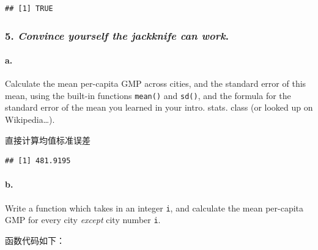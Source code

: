 \documentclass[
]{article}
\newenvironment{Shaded}{\begin{snugshade}}{\end{snugshade}}
\newcommand{\ControlFlowTok}[1]{\textcolor[rgb]{0.13,0.29,0.53}{\textbf{#1}}}
\newcommand{\FunctionTok}[1]{\textcolor[rgb]{0.13,0.29,0.53}{\textbf{#1}}}
\newcommand{\NormalTok}[1]{#1}
\newcommand{\OtherTok}[1]{\textcolor[rgb]{0.56,0.35,0.01}{#1}}
\newcommand{\SpecialCharTok}[1]{\textcolor[rgb]{0.81,0.36,0.00}{\textbf{#1}}}
\begin{document}
\begin{verbatim}
## [1] TRUE
\end{verbatim}

\subsubsection{\texorpdfstring{5. \emph{Convince yourself the jackknife
can
work}.}{5. Convince yourself the jackknife can work.}}\label{convince-yourself-the-jackknife-can-work.}

\paragraph{a.}\label{a.}

Calculate the mean per-capita GMP across cities, and the standard error
of this mean, using the built-in functions \texttt{mean()} and
\texttt{sd()}, and the formula for the standard error of the mean you
learned in your intro. stats. class (or looked up on Wikipedia\ldots).

直接计算均值标准误差

\begin{Shaded}
\end{Shaded}

\begin{verbatim}
## [1] 481.9195
\end{verbatim}

\paragraph{b.}\label{b.}

Write a function which takes in an integer \texttt{i}, and calculate the
mean per-capita GMP for every city \emph{except} city number \texttt{i}.

函数代码如下：

\begin{Shaded}
\end{Shaded}
\end{document}

